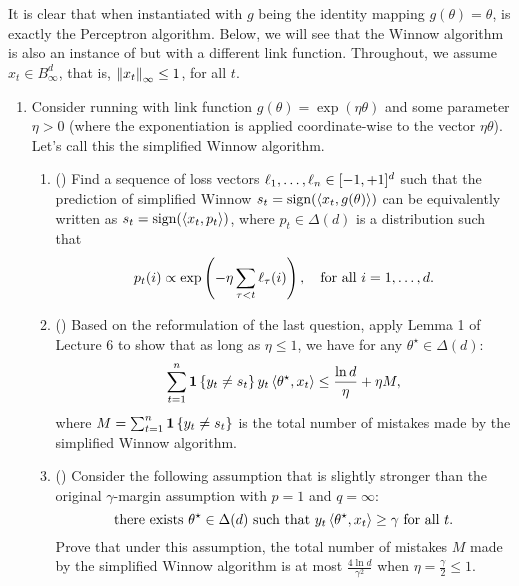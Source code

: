 \documentclass{article}
\begin{document}
\begin{enumerate}[leftmargin=*,align=left]
It is clear that when instantiated with $g$ being the identity mapping $g(\theta) = \theta$,  is exactly the Perceptron algorithm.
Below, we will see that the Winnow algorithm is also an instance of  but with a different link function.
Throughout, we assume $x_t \in B_\infty^d$, that is, $\left\|{x_t}\right\|_\infty \leq 1$, for all $t$.

\begin{enumerate}[leftmargin=*,align=left]
\vspace{5pt}
\item 
Consider running  with link function $g(\theta) = \exp(\eta\theta)$ and some parameter $\eta > 0$ (where the exponentiation is applied coordinate-wise to the vector $\eta\theta$).
Let's call this the simplified Winnow algorithm.

\begin{enumerate}[leftmargin=*,align=left]
\vspace{5pt}
\item () Find a sequence of loss vectors $\ell_1, \ldots, \ell_n \in [-1,+1]^d$ such that the prediction of simplified Winnow $s_t = {\text{\rm sign}}(\left\langle x_t,g(\theta) \right\rangle)$ can be equivalently written as $s_t = {\text{\rm sign}}(\left\langle x_t,p_t \right\rangle)$,  where $p_t \in \Delta(d)$ is a distribution such that 
\[
p_t(i) \propto \exp\left(-\eta \sum_{\tau<t} \ell_\tau(i)\right), \quad\text{for all $i = 1, \ldots, d$.}
\]


\vspace{5pt}
\item ()
Based on the reformulation of the last question, apply Lemma 1 of Lecture 6 to show that as long as $\eta \leq 1$, we have for any $\theta^\star \in \Delta(d)$:
\[
\sum_{t=1}^n \boldsymbol{1}\left\{y_t \neq s_t\right\} y_t\left\langle \theta^\star,x_t \right\rangle
\leq \frac{\ln d}{\eta} + \eta M,
\]
where $M = \sum_{t=1}^n \boldsymbol{1}\left\{y_t \neq s_t\right\}$ is the total number of mistakes made by the simplified Winnow algorithm. \\


\vspace{5pt}
\item ()
Consider the following assumption that is slightly stronger than the original $\gamma$-margin assumption with $p=1$ and $q=\infty$:
\begin{equation}\label{eqn:simplified_margin}
\text{there exists $\theta^\star \in \Delta(d)$ such that $y_t\left\langle \theta^\star,x_t \right\rangle \geq \gamma$ for all $t$.}
\end{equation}
Prove that under this assumption, the total number of mistakes $M$ made by the simplified Winnow algorithm is at most $\frac{4\ln d}{\gamma^2}$ when $\eta = \frac{\gamma}{2} \leq 1$. \\



\end{enumerate}
\end{enumerate}
\end{enumerate}
\end{document}
